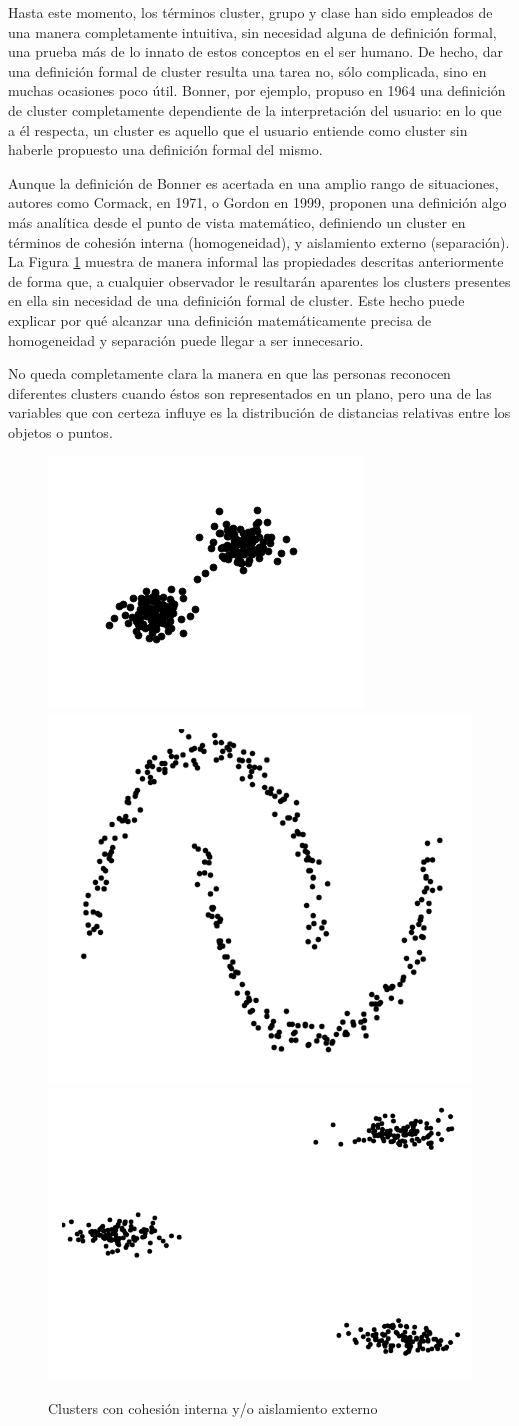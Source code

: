 Hasta este momento, los términos cluster, grupo y clase han sido empleados de una manera completamente intuitiva, sin necesidad alguna de definición formal, una prueba más de lo innato de estos conceptos en el ser humano. De hecho, dar una definición formal de cluster resulta una tarea no, sólo complicada, sino en muchas ocasiones poco útil. Bonner, por ejemplo, propuso en 1964 una definición de cluster completamente dependiente de la interpretación del usuario: en lo que a él respecta, un cluster es aquello que el usuario entiende como cluster sin haberle propuesto una definición formal del mismo.

Aunque la definición de Bonner es acertada en una amplio rango de situaciones, autores como Cormack, en 1971, o Gordon en 1999, proponen una definición algo más analítica desde el punto de vista matemático, definiendo un cluster en términos de cohesión interna (homogeneidad), y aislamiento externo (separación). La Figura \ref{fig:figure1} muestra de manera informal las propiedades descritas anteriormente de forma que, a cualquier observador le resultarán aparentes los clusters presentes en ella sin necesidad de una definición formal de cluster. Este hecho puede explicar por qué alcanzar una definición matemáticamente precisa de homogeneidad y separación puede llegar a ser innecesario.

No queda completamente clara la manera en que las personas reconocen diferentes clusters cuando éstos son representados en un plano, pero una de las variables que con certeza influye es la distribución de distancias relativas entre los objetos o puntos.

\clearpage

\begin{figure}[bth]
	\myfloatalign
	{\includegraphics[width=.3\linewidth]{imagenes/c2/TwoBasicsClusters}}
	{\includegraphics[width=.3\linewidth]{imagenes/c2/MoonsBasics}}
	{\includegraphics[width=.3\linewidth]{imagenes/c2/ThreeBasicClusters}}
	\caption[Clusters con cohesión interna y/o aislamiento externo]{Clusters con cohesión interna y/o aislamiento externo}\label{fig:figure1}
\end{figure}

